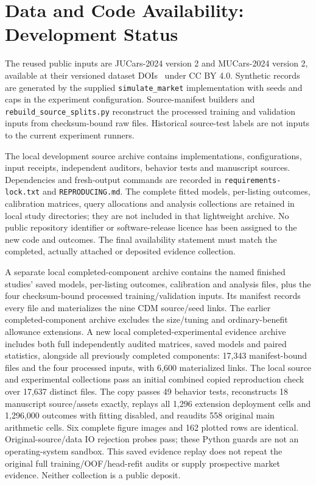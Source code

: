 \section{Data and Code Availability: Development Status}
The reused public inputs are JUCars-2024 version 2 and MUCars-2024 version 2,
available at their versioned dataset DOIs~\cite{thalji2026jucars,tabarnoust2024mucars}
under CC BY 4.0. Synthetic records are generated by the supplied
\texttt{simulate\_market} implementation with seeds and caps in the experiment
configuration. Source-manifest builders and
\texttt{rebuild\_source\_splits.py} reconstruct the processed training and
validation inputs from checksum-bound raw files. Historical source-test
labels are not inputs to the current experiment runners.

The local development source archive contains implementations, configurations,
input receipts, independent auditors, behavior tests and manuscript sources.
Dependencies and fresh-output commands are recorded in
\texttt{requirements-lock.txt} and \texttt{REPRODUCING.md}. The complete fitted
models, per-listing outcomes, calibration matrices, query allocations and
analysis collections are retained in local study directories; they are not
included in that lightweight archive. No public repository identifier or
software-release licence has been assigned to the new code and outcomes.
The final availability statement must match the completed, actually attached
or deposited evidence collection.

A separate local completed-component archive contains the named finished
studies' saved models, per-listing outcomes, calibration and analysis files,
plus the four checksum-bound processed training/validation inputs. Its
manifest records every file and materializes the nine CDM source/seed links.
The earlier completed-component archive excludes the size/tuning and
ordinary-benefit allowance extensions. A new local completed-experimental
evidence archive includes both full independently audited matrices, saved
models and paired statistics, alongside all previously completed components:
17,343 manifest-bound files and the four processed inputs, with 6,600
materialized links. The local source and experimental collections pass an initial combined copied
reproduction check over 17,637 distinct files. The copy passes 49 behavior
tests, reconstructs 18 manuscript source/assets exactly, replays all 1,296
extension deployment cells and 1,296,000 outcomes with fitting disabled,
and reaudits 558 original main arithmetic cells. Six complete figure images
and 162 plotted rows are identical. Original-source/data IO rejection probes
pass; these Python guards are not an operating-system sandbox. This saved
evidence replay does not repeat the original full training/OOF/head-refit
audits or supply prospective market evidence. Neither collection is a
public deposit.
